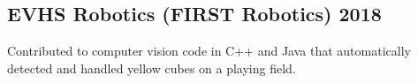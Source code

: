 \documentclass[../Resume.tex]{subfiles}
\begin{document}
	\subsection{EVHS Robotics (FIRST Robotics) \null\hfill 2018}
	\par Contributed to computer vision code in C++ and Java that automatically detected and handled yellow cubes on a playing field.
	\vspace*{-2mm}
\end{document}
